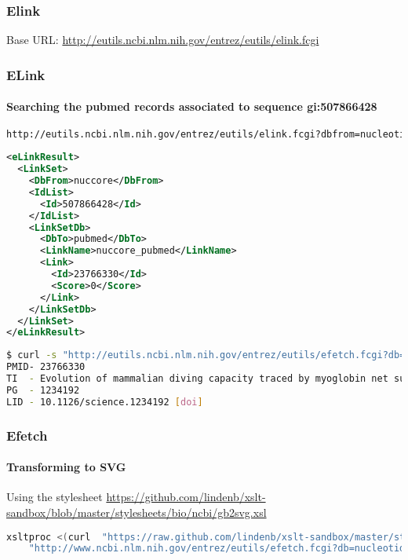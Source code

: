 \documentclass{beamer}
\begin{document}
\begin{frame}[fragile]
\frametitle{Elink}
Base URL:
\small
\url{http://eutils.ncbi.nlm.nih.gov/entrez/eutils/elink.fcgi}
\end{frame}


\begin{frame}[fragile]
\frametitle{ELink}
\framesubtitle{Searching the pubmed records associated to sequence gi:507866428}
\begin{lstlisting}[language=bash,basicstyle=\tiny,breaklines=true,escapechar=\!]
http://eutils.ncbi.nlm.nih.gov/entrez/eutils/elink.fcgi?dbfrom=nucleotide&db=pubmed&id=507866428&cmd=neighbor_score
\end{lstlisting}

\begin{lstlisting}[language=xml,basicstyle=\tiny,breaklines=true,escapechar=\%]
<eLinkResult>
  <LinkSet>
    <DbFrom>nuccore</DbFrom>
    <IdList>
      <Id>507866428</Id>
    </IdList>
    <LinkSetDb>
      <DbTo>pubmed</DbTo>
      <LinkName>nuccore_pubmed</LinkName>
      <Link>
        <Id>23766330</Id>
        <Score>0</Score>
      </Link>
    </LinkSetDb>
  </LinkSet>
</eLinkResult>

\end{lstlisting}

\begin{lstlisting}[language=bash,basicstyle=\tiny,breaklines=true,escapechar=\!]
$ curl -s "http://eutils.ncbi.nlm.nih.gov/entrez/eutils/efetch.fcgi?db=pubmed&id=23766330&rettype=medline&remode=text"
PMID- 23766330
TI  - Evolution of mammalian diving capacity traced by myoglobin net surface charge.
PG  - 1234192
LID - 10.1126/science.1234192 [doi]
\end{lstlisting}
\end{frame}

\begin{frame}[fragile]
\frametitle{Efetch}
\framesubtitle{Transforming to SVG}

Using the stylesheet \url{https://github.com/lindenb/xslt-sandbox/blob/master/stylesheets/bio/ncbi/gb2svg.xsl}

\begin{lstlisting}[language=bash,basicstyle=\tiny,breaklines=true,escapechar=\!]
xsltproc <(curl  "https://raw.github.com/lindenb/xslt-sandbox/master/stylesheets/bio/ncbi/gb2svg.xsl") \
	"http://www.ncbi.nlm.nih.gov/entrez/eutils/efetch.fcgi?db=nucleotide&id=14971102&retmode=xml&rettype=gbc"
\end{lstlisting}
\end{frame}
\end{document}
